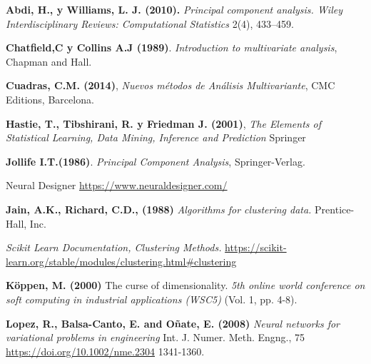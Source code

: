 
\begin{thebibliography}{99}
	

 \textbf{Abdi, H., y Williams, L. J. (2010).} \textit{Principal component analysis. Wiley Interdisciplinary Reviews: Computational Statistics}  2(4), 433–459. 

 \textbf{Chatfield,C y Collins A.J (1989)}. {\em Introduction to multivariate analysis}, Chapman and Hall.

 \textbf{Cuadras, C.M. (2014)}, \textit{Nuevos métodos de Análisis Multivariante}, CMC Editions, Barcelona. 

 \textbf{Hastie, T., Tibshirani, R. y Friedman J. (2001)}, \textit{The Elements of Statistical Learning, Data Mining, Inference and Prediction} Springer 

 \textbf{Jollife I.T.(1986)}. {\em Principal Component Analysis}, Springer-Verlag.

 Neural Designer \url{https://www.neuraldesigner.com/}

 \textbf{Jain, A.K., Richard, C.D., (1988)} \textit{Algorithms for clustering data.} Prentice-Hall, Inc. 

 \textit{Scikit Learn Documentation, Clustering Methods. } \url{https://scikit-learn.org/stable/modules/clustering.html#clustering}

 \textbf{Köppen, M. (2000)} The curse of dimensionality. \textit{5th online world conference on soft computing in industrial applications (WSC5)}  (Vol. 1, pp. 4-8).
          
 \textbf{Lopez, R., Balsa-Canto, E. and Oñate, E. (2008)} \textit{ Neural networks for variational problems in engineering} Int. J. Numer. Meth. Engng., 75\\ \url{https://doi.org/10.1002/nme.2304} 1341-1360. 
\end{thebibliography}
 